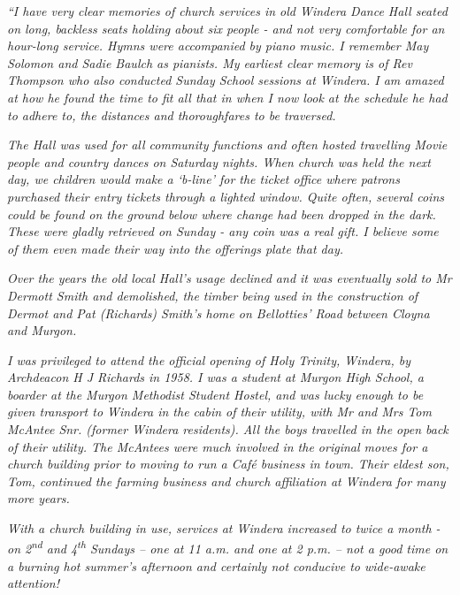 \emph{``I have very clear memories of church services in old Windera Dance Hall seated on long, backless seats holding about six people - and not very comfortable for an hour-long service. Hymns were accompanied by piano music. I remember May Solomon and Sadie Baulch as pianists. My earliest clear memory is of Rev Thompson who also conducted Sunday School sessions at Windera. I am amazed at how he found the time to fit all that in when I now look at the schedule he had to adhere to, the distances and thoroughfares to be traversed.}



\emph{The Hall was used for all community functions and often hosted travelling Movie people and country dances on Saturday nights. When church was held the next day, we children would make a `b-line' for the ticket office where patrons purchased their entry tickets through a lighted window. Quite often, several coins could be found on the ground below where change had been dropped in the dark. These were gladly retrieved on Sunday - any coin was a real gift. I believe some of them even made their way into the offerings plate that day.}



\emph{Over the years the old local Hall's usage declined and it was eventually sold to Mr Dermott Smith and demolished, the timber being used in the construction of Dermot and Pat (Richards) Smith's home on Bellotties' Road between Cloyna and Murgon.}



\emph{I was privileged to attend the official opening of Holy Trinity, Windera, by Archdeacon H J Richards in 1958. I was a student at Murgon High School, a boarder at the Murgon Methodist Student Hostel, and was lucky enough to be given transport to Windera in the cabin of their utility, with Mr and Mrs Tom McAntee Snr. (former Windera residents). All the boys travelled in the open back of their utility. The McAntees were much involved in the original moves for a church building prior to moving to run a Café business in town. Their eldest son, Tom, continued the farming business and church affiliation at Windera for many more years.}



\emph{With a church building in use, services at Windera increased to twice a month - on 2\textsuperscript{nd} and 4\textsuperscript{th} Sundays -- one at 11 a.m. and one at 2 p.m. -- not a good time on a burning hot summer's afternoon and certainly not conducive to wide-awake attention!}



